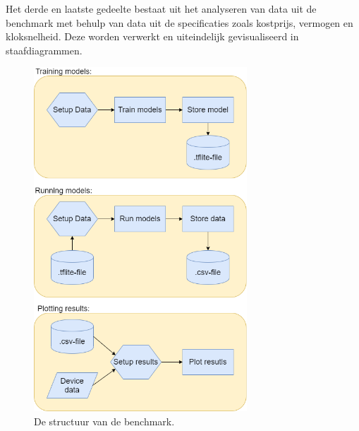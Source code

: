 Het derde en laatste gedeelte bestaat uit het analyseren van data uit de benchmark met behulp van data uit de specificaties zoals kostprijs, vermogen en kloksnelheid. Deze worden verwerkt en uiteindelijk gevisualiseerd in staafdiagrammen.

\begin{figure}
	\centering
	\includegraphics[width=80mm]{afbeeldingen/structureFlowchart.png}
	\caption{De structuur van de benchmark.}
	\label{fig:structureflowchart}
\end{figure}


